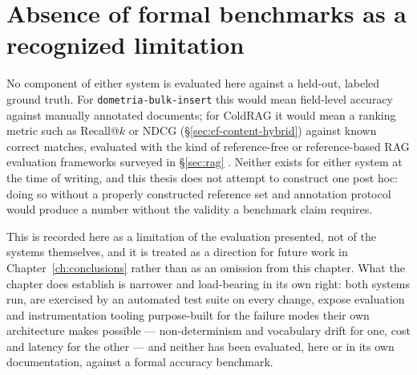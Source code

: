 \section{Absence of formal benchmarks as a recognized limitation}
\label{sec:results-limitations}

No component of either system is evaluated here against a held-out, labeled ground truth. For \texttt{dometria-bulk-insert} this would mean field-level accuracy against manually annotated documents; for ColdRAG it would mean a ranking metric such as Recall@$k$ or NDCG (\S\ref{sec:cf-content-hybrid}) against known correct matches, evaluated with the kind of reference-free or reference-based RAG evaluation frameworks surveyed in \S\ref{sec:rag} \citep{es2024ragas,chen2024benchmarking}. Neither exists for either system at the time of writing, and this thesis does not attempt to construct one post hoc: doing so without a properly constructed reference set and annotation protocol would produce a number without the validity a benchmark claim requires.

This is recorded here as a limitation of the evaluation presented, not of the systems themselves, and it is treated as a direction for future work in Chapter~\ref{ch:conclusions} rather than as an omission from this chapter. What the chapter does establish is narrower and load-bearing in its own right: both systems run, are exercised by an automated test suite on every change, expose evaluation and instrumentation tooling purpose-built for the failure modes their own architecture makes possible — non-determinism and vocabulary drift for one, cost and latency for the other — and neither has been evaluated, here or in its own documentation, against a formal accuracy benchmark.
